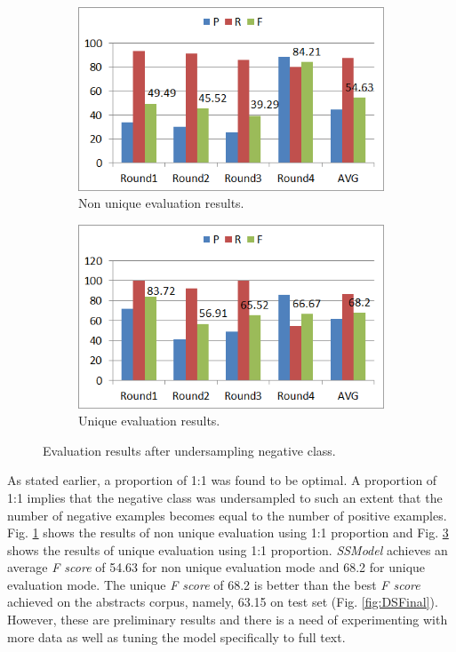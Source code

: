 \begin{figure}
\centering
\begin{subfigure}{.5\textwidth}
  \centering
  \includegraphics[width=.95\linewidth]{figures/4_FTSameRatioResults.png}
  \caption{Non unique evaluation results.}
  \label{fig:FT_ResUnderSampNonUniq}
\end{subfigure}%
\begin{subfigure}{.5\textwidth}
  \centering
  \includegraphics[width=.95\linewidth]{figures/4_FTSameRatioResults_Uniq.png}
  \caption{Unique evaluation results.}
  \label{fig:FT_ResUnderSampUniq}
\end{subfigure}
\caption{Evaluation results after undersampling negative class.}
\end{figure}

As stated earlier, a proportion of 1:1 was found to be optimal. A proportion of 1:1 implies that the negative class was undersampled to such an extent that the number of negative examples becomes equal to the number of positive examples. Fig. \ref{fig:FT_ResUnderSampNonUniq} shows the results of non unique evaluation using 1:1 proportion and Fig. \ref{fig:FT_ResUnderSampUniq} shows the results of unique evaluation using 1:1 proportion. \textit{SSModel} achieves an average \textit{F score} of 54.63 for non unique evaluation mode and 68.2 for unique evaluation mode. The unique \textit{F score} of 68.2 is better than the best \textit{F score} achieved on the abstracts corpus, namely, 63.15 on test set (Fig. \ref{fig:DSFinal}). However, these are preliminary results and there is a need of experimenting with more data as well as tuning the model specifically to full text.


